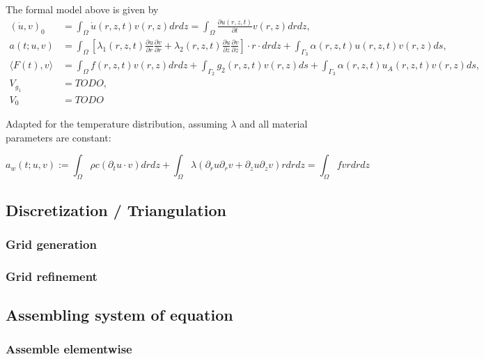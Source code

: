 \documentclass[parskip=half, titlepage=yes, 12pt, BCOR=12mm, DIV=calc]{scrartcl}
\begin{document}
The formal model above is given by 
\begin{align*}
    (\Dot{u},v)_0 &= \int_{\Omega} \Dot{u}(r,z,t)v(r,z) drdz = \int_{\Omega} \frac{\partial u(r,z,t)}{\partial t} v(r,z) drdz, \\
    a(t;u,v) &= \int_{\Omega} \left[ \lambda_1(r,z,t) \frac{\partial u}{\partial r} \frac{\partial v}{\partial r} + \lambda_2(r,z,t) \frac{\partial u}{\partial z} \frac{\partial v}{\partial z} \right] \cdot r \cdot drdz + \int_{\Gamma_3} \alpha(r,z,t)u(r,z,t)v(r,z) ds, \\
    \langle F(t),v \rangle &= \int_{\Omega} f(r,z,t)v(r,z) drdz + \int_{\Gamma_2} g_2(r,z,t)v(r,z) ds + \int_{\Gamma_3} \alpha(r,z,t)u_A(r,z,t)v(r,z) ds, \\
    V_{g_1} &= TODO, \\
    V_0 &= TODO
\end{align*}

Adapted for the temperature distribution, assuming $\lambda$ and all material parameters are constant: 

\begin{equation}
    a_w(t;u,v) := \int_{\Omega} \rho c (\partial_t u \cdot v) drdz + \int_{\Omega} \lambda (\partial_r u \partial_r v + \partial_z u \partial_z v) r drdz = \int_{\Omega} f v r dr dz
\end{equation}

\newpage

\subsection{Discretization / Triangulation}

\subsubsection{Grid generation}

\subsubsection{Grid refinement}


\subsection{Assembling system of equation}

\subsubsection{Assemble elementwise}
\end{document}
